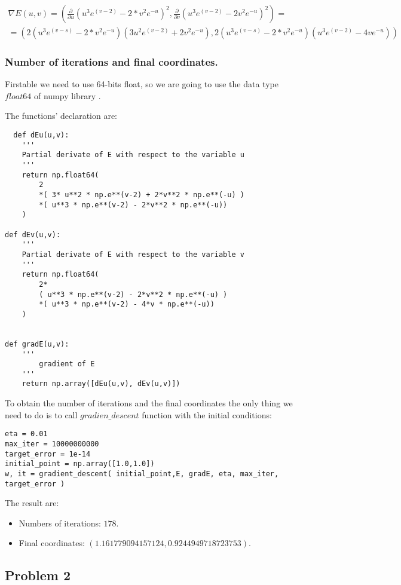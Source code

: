 \begin{multline*}
  \nabla E(u,v) = \left( \frac{\partial}{\partial u}(u^3 e^{(v-2)} - 2* v^2 e^{-u})^2 , \frac{\partial}{\partial v} (u^3 e^{(v-2)} - 2 v^2 e^{-u})^2 \right) = \\
 =  \left(2(u^3 e^{(v-s)} - 2* v^2 e^{-u})(3u^2e^{(v-2)} + 2 v^2 e^{-u} ), 2(u^3 e^{(v-s)} - 2* v^2 e^{-u})(u^3 e^{(v-2)} - 4 v e^{-u}) \right)
\end{multline*}


\subsubsection{Number of iterations and final coordinates.}

Firstable we need to use 64-bits float, so we are going to use the data type $float64$ of numpy library \cite{float64}.

The functions' declaration are:

\begin{verbatim}
  def dEu(u,v):
    '''
    Partial derivate of E with respect to the variable u
    '''
    return np.float64(
        2
        *( 3* u**2 * np.e**(v-2) + 2*v**2 * np.e**(-u) )
        *( u**3 * np.e**(v-2) - 2*v**2 * np.e**(-u))
    )
    
def dEv(u,v):
    '''
    Partial derivate of E with respect to the variable v
    '''
    return np.float64(
        2*
        ( u**3 * np.e**(v-2) - 2*v**2 * np.e**(-u) )
        *( u**3 * np.e**(v-2) - 4*v * np.e**(-u))
    )


def gradE(u,v):
    ''' 
        gradient of E
    '''
    return np.array([dEu(u,v), dEv(u,v)])

\end{verbatim}

To obtain the number of iterations and the final coordinates the only thing we need to do is to call $gradien\_descent$ function with the initial conditions:

\begin{verbatim}
eta = 0.01 
max_iter = 10000000000
target_error = 1e-14
initial_point = np.array([1.0,1.0])
w, it = gradient_descent( initial_point,E, gradE, eta, max_iter, target_error )
\end{verbatim}

The result are:

\begin{itemize}
\item Numbers of iterations: $178.$
\item Final coordinates: $( 1.161779094157124 ,  0.9244949718723753 ).$
\end{itemize}


\subsection{Problem 2}